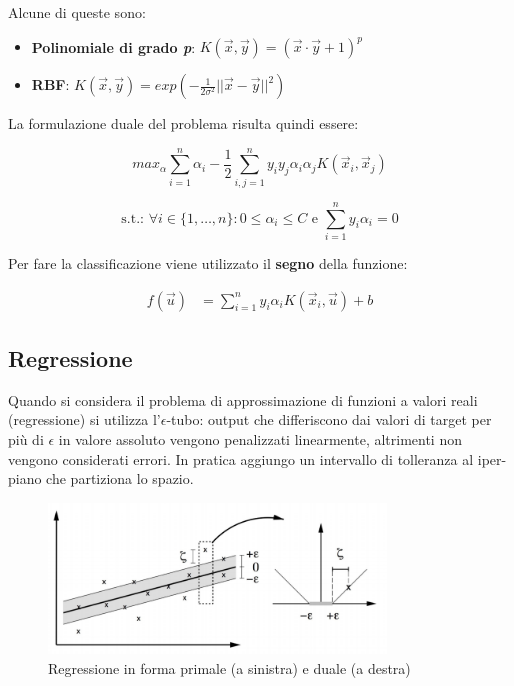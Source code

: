 Alcune di queste sono:

\begin{itemize}
\item \textbf{Polinomiale di grado \textit{p}}: $K(\vec{x},\vec{y}) = (\vec{x} \cdot \vec{y} +1) ^p$
\item \textbf{RBF}: $ K(\vec{x},\vec{y}) = exp(-\frac{1}{2\sigma^2}||\vec{x}-\vec{y}||^2)$
\end{itemize}

La formulazione duale del problema risulta quindi essere:

$$max_\alpha \sum\limits_{i=1}^n \alpha_i - \frac{1}{2}\sum\limits_{i,j = 1}^n y_i y_j \alpha_i \alpha_j K(\vec{x}_i ,\vec{x}_j)$$

$$ \text{s.t.: } \forall i \in \{1, \ldots, n\} : 0 \leq \alpha_i \leq C \text{ e } \sum\limits_{i=1}^n y_i \alpha_i = 0$$

Per fare la classificazione viene utilizzato il \textbf{segno} della funzione:

\begin{align*}
f(\vec{u})  &= \sum\limits_{i = 1}^n y_i  \alpha_i  K(\vec{x}_i,  \vec{u}) + b
\end{align*}

\subsection{Regressione}\label{regressione}

Quando si considera il problema di approssimazione di funzioni a valori
reali (regressione) si utilizza l'$\epsilon$-tubo: output che differiscono dai
valori di target per più di $\epsilon$ in valore assoluto vengono penalizzati
linearmente, altrimenti non vengono considerati errori. In pratica
aggiungo un intervallo di tolleranza al iper-piano che partiziona lo
spazio.

\begin{figure}[htbp]
\centering
\includegraphics[width = 0.8\textwidth]{./notes/immagini/l13-primale-duale.png}
\caption{Regressione in forma primale (a sinistra) e duale (a destra)}
\end{figure}

